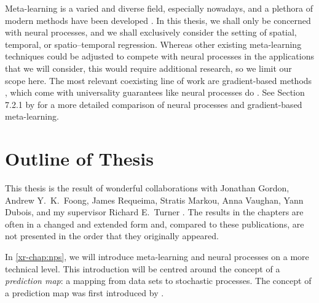 \documentclass[12pt, twoside]{report}
\newcommand{\xrprefix}[1]{xr-#1}
\begin{document}
Meta-learning is a varied and diverse field, especially nowadays,
and a plethora of modern methods have been developed
\parencite{Andrychowicz:2016:Learning_to_Learn_by_Gradient,
Vinyals:2016:Matching_Networks_for_One_Shot,
Ravi:2017:Optimization_as_a_Model_for,
Edwards:2017:Towards_a_Neural_Statistician,
Snell:2017:Prototypical_Networks_for_Few-Shot_Learning,
Finn:2017:Model-Agnostic_Meta-Learning_for_Fast_Adaptation,
Garnelo:2018:Conditional_Neural_Processes,
Gordon:2019:Meta-Learning_Probabilistic_Inference_for_Prediction,
Requeima:2019:Fast_and_Flexible_Multi-Task_Classification}.
In this thesis, we shall only be concerned with neural processes,
and we shall exclusively consider the setting of spatial, temporal, or spatio--temporal regression.
Whereas other existing meta-learning techniques could be adjusted to compete with neural processes in the applications that we will consider, this would require additional research, so we limit our scope here.
The most relevant coexisting line of work are gradient-based methods \parencite{Finn:2017:Model-Agnostic_Meta-Learning_for_Fast_Adaptation,Finn:2018:Probabilistic_Model-Agnostic_Meta-Learning}, which come with universality guarantees like neural processes do \parencite{Finn:2018:Meta-Learning_and_Universality_Deep_Representations}.
See Section 7.2.1 by \textcite{Gordon:2020:Advanced_in_Probabilistic_Meta-Learning} for a more detailed comparison of neural processes and gradient-based meta-learning.

\section{Outline of Thesis}
\label{sec:introduction:overview}

This thesis is the result of wonderful collaborations with 
Jonathan Gordon,
Andrew Y.\ K.\ Foong,
James Requeima,
Stratis Markou,
Anna Vaughan,
Yann Dubois,
and my supervisor
Richard E.\ Turner
\parencite{Gordon:2020:Convolutional_Conditional_Neural_Processes,
Foong:2020:Meta-Learning_Stationary_Stochastic_Process_Prediction,
Bruinsma:2021:The_Gaussian_Neural_Process,
Markou:2022:Practical_Conditional_Neural_Processes_for_Tractable}.
The results in the chapters are often in a changed and extended form and, compared to these publications, are not presented in the order that they originally appeared.

In \cref{\xrprefix{chap:nps}}, 
we will introduce meta-learning and neural processes on a more technical level.
This introduction will be centred around the concept of a \emph{prediction map}:
a mapping from data sets to stochastic processes.
The concept of a prediction map was first introduced by \textcite{Foong:2020:Meta-Learning_Stationary_Stochastic_Process_Prediction}.
\end{document}
